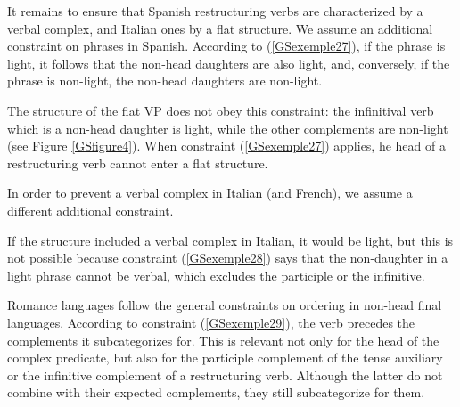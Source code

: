 \documentclass[output=paper]{langsci/langscibook}
\begin{document}
{It remains to ensure that Spanish restructuring verbs are characterized by a verbal complex, and Italian ones by a flat structure. We assume an additional constraint on phrases in Spanish. According to (\ref{GSexemple27}), if the phrase is light, it follows that the non-head daughters are also light, and, conversely, if the phrase is non-light, the non-head daughters are non-light.

\begin{exe}
\end{exe}
The structure of the flat VP does not obey this constraint: the infinitival verb which is a non-head daughter is light, while the other complements are non-light (see Figure \ref{GSfigure4}). When constraint (\ref{GSexemple27}) applies, he head of a restructuring verb cannot enter a flat structure. 

In order to prevent a verbal complex in Italian (and French), we assume a different additional constraint.

\begin{exe}
\end{exe}

If the structure included a verbal complex in Italian, it would be light, but this is not possible because constraint (\ref{GSexemple28}) says that the non-daughter in a light phrase cannot be verbal, which excludes the participle or the infinitive.

Romance languages follow the general constraints on ordering in non-head final languages. According to constraint (\ref{GSexemple29}), the verb precedes the complements it subcategorizes for. This is relevant not only for the head of the complex predicate, but also for the participle complement of the tense auxiliary or the infinitive complement of a restructuring verb. Although the latter do not combine with their expected complements, they still subcategorize for them.  

}
\end{document}
